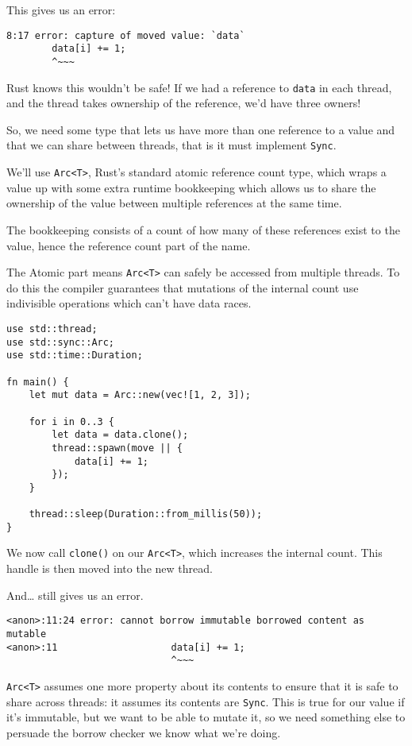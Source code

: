 \documentclass[a4paper,]{book}
\begin{document}
This gives us an error:

\begin{verbatim}
8:17 error: capture of moved value: `data`
        data[i] += 1;
        ^~~~
\end{verbatim}

Rust knows this wouldn't be safe! If we had a reference to \texttt{data}
in each thread, and the thread takes ownership of the reference, we'd
have three owners!

So, we need some type that lets us have more than one reference to a
value and that we can share between threads, that is it must implement
\texttt{Sync}.

We'll use \texttt{Arc\textless{}T\textgreater{}}, Rust's standard atomic
reference count type, which wraps a value up with some extra runtime
bookkeeping which allows us to share the ownership of the value between
multiple references at the same time.

The bookkeeping consists of a count of how many of these references
exist to the value, hence the reference count part of the name.

The Atomic part means \texttt{Arc\textless{}T\textgreater{}} can safely
be accessed from multiple threads. To do this the compiler guarantees
that mutations of the internal count use indivisible operations which
can't have data races.

\begin{verbatim}
use std::thread;
use std::sync::Arc;
use std::time::Duration;

fn main() {
    let mut data = Arc::new(vec![1, 2, 3]);

    for i in 0..3 {
        let data = data.clone();
        thread::spawn(move || {
            data[i] += 1;
        });
    }

    thread::sleep(Duration::from_millis(50));
}
\end{verbatim}

We now call \texttt{clone()} on our
\texttt{Arc\textless{}T\textgreater{}}, which increases the internal
count. This handle is then moved into the new thread.

And\ldots{} still gives us an error.

\begin{verbatim}
<anon>:11:24 error: cannot borrow immutable borrowed content as mutable
<anon>:11                    data[i] += 1;
                             ^~~~
\end{verbatim}

\texttt{Arc\textless{}T\textgreater{}} assumes one more property about
its contents to ensure that it is safe to share across threads: it
assumes its contents are \texttt{Sync}. This is true for our value if
it's immutable, but we want to be able to mutate it, so we need
something else to persuade the borrow checker we know what we're doing.
\end{document}
